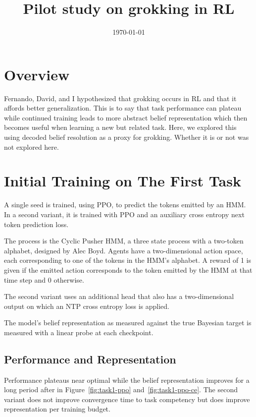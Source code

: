 \documentclass[11pt]{article}
\title{Pilot study on grokking in RL}
\author{}
\date{\today}
\begin{document}
\maketitle

\section{Overview}

Fernando, David, and I hypothesized that grokking occurs in RL and that it affords better
generalization. This is to say that task performance can plateau while
continued training leads to more abstract belief representation which then
becomes useful when learning a new but related task.
Here, we explored this using decoded belief resolution as a proxy for grokking. Whether it is or not was not explored here.

\section{Initial Training on The First Task}

A single seed is trained, using PPO, to predict the tokens emitted by an HMM.
In a second variant, it is trained with PPO and an auxiliary cross entropy
next token prediction loss.

The process is the Cyclic Pusher HMM, a three state process with a two-token
alphabet, designed by Alec Boyd. Agents have a two-dimensional action space,
each corresponding to one of the tokens in the HMM's alphabet. A reward of 1
is given if the emitted action corresponds to the token emitted by the HMM at
that time step and 0 otherwise.

The second variant uses an additional head that also has a two-dimensional
output on which an NTP cross entropy loss is applied.

The model's belief representation as measured against the true Bayesian
target is measured with a linear probe at each checkpoint.

\subsection{Performance and Representation}

Performance plateaus near optimal while the belief representation improves
for a long period after in Figure~\ref{fig:task1-ppo}
and~\ref{fig:task1-ppo-ce}. The second variant does not improve convergence
time to task competency but does improve representation per training budget.
\end{document}
